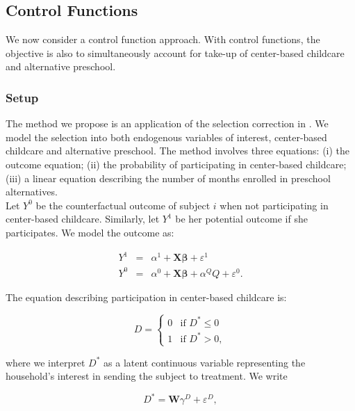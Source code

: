 \subsection{Control Functions}

\noindent We now consider a control function approach. With control functions, the objective is also to simultaneously account for take-up of center-based childcare and alternative preschool.

\subsubsection{Setup}

\noindent The method we propose is an application of the selection correction in \citet{Heckman_1979_Econometrica}. We model the selection into both endogenous variables of interest, center-based childcare and alternative preschool. The method involves three equations: (i) the outcome equation; (ii) the probability of participating in center-based childcare; (iii) a linear equation describing the number of months enrolled in preschool alternatives.\\

\noindent Let $Y^{0}$ be the counterfactual outcome of subject $i$ when not participating in center-based childcare. Similarly, let $Y^{1}$ be her potential outcome if she participates. We model the outcome as:

\begin{eqnarray}
Y^1 &=& \alpha^1+\mathbf{X} \mathbf{\beta}                 +\varepsilon^1 \nonumber  \\
Y^0 &=& \alpha^0+\mathbf{X} \mathbf{\beta} + \alpha^Q Q+\varepsilon^0.  \label{eq:potout}
\end{eqnarray}

\noindent The equation describing participation in center-based childcare is:

\begin{equation}
D = \left\{
        \begin{array}{ll}
        	0 &\text{if } D^* \leq  0 \\
            1 &\text{if } D^* > 0, \label{eq:sel1}
        \end{array}
    \right.
\end{equation}

\noindent where we interpret $D^*$ as a latent continuous variable representing the household's interest in sending the subject to treatment. We write

\begin{equation}
D^{*} = \mathbf{W} \gamma^{D} + \varepsilon^{D}, \label{eq:probitD}
\end{equation}

